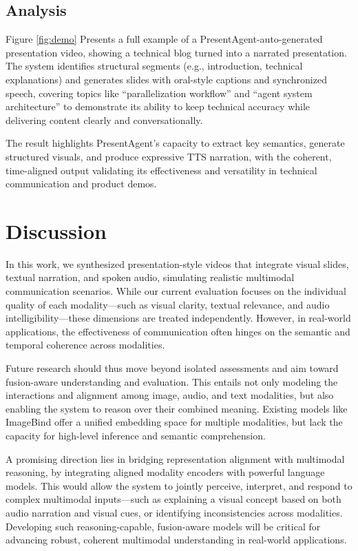 \documentclass[11pt]{article}
\begin{document}
\subsection{Analysis}
 

Figure \ref{fig:demo} Presents a full example of a PresentAgent-auto-generated presentation video, showing a technical blog turned into a narrated presentation. The system identifies structural segments (e.g., introduction, technical explanations) and generates slides with oral-style captions and synchronized speech, covering topics like “parallelization workflow” and “agent system architecture” to demonstrate its ability to keep technical accuracy while delivering content clearly and conversationally.

The result highlights PresentAgent’s capacity to extract key semantics, generate structured visuals, and produce expressive TTS narration, with the coherent, time-aligned output validating its effectiveness and versatility in technical communication and product demos.



\section{Discussion}


In this work, we synthesized presentation-style videos that integrate visual slides, textual narration, and spoken audio, simulating realistic multimodal communication scenarios. While our current evaluation focuses on the individual quality of each modality—such as visual clarity, textual relevance, and audio intelligibility—these dimensions are treated independently. However, in real-world applications, the effectiveness of communication often hinges on the semantic and temporal coherence across modalities.

Future research should thus move beyond isolated assessments and aim toward fusion-aware understanding and evaluation. This entails not only modeling the interactions and alignment among image, audio, and text modalities, but also enabling the system to reason over their combined meaning. Existing models like ImageBind offer a unified embedding space for multiple modalities, but lack the capacity for high-level inference and semantic comprehension.

A promising direction lies in bridging representation alignment with multimodal reasoning, by integrating aligned modality encoders with powerful language models. This would allow the system to jointly perceive, interpret, and respond to complex multimodal inputs—such as explaining a visual concept based on both audio narration and visual cues, or identifying inconsistencies across modalities. Developing such reasoning-capable, fusion-aware models will be critical for advancing robust, coherent multimodal understanding in real-world applications.
\end{document}
